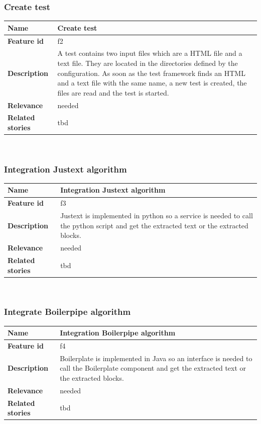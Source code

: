 \subsubsection{Create test}


	\begin{tabular}{ | p{3cm} | p{12cm} |}
	\hline
	\textbf{Name} 				& Create test \\ \hline
	\textbf{Feature id} 		& f2 \\ \hline
	\textbf{Description} 		& A test contains two input files which are a HTML file and a text file. They are located in the directories defined by the configuration. As soon as the test framework finds an HTML and a text file with the same name, a new test is created, the files are read and the test is started.\\ \hline
	\textbf{Relevance} 			& needed \\ \hline
	\textbf{Related stories} 	& tbd \\ \hline
	\end{tabular} \\

\subsubsection{Integration Justext algorithm}


	\begin{tabular}{ | p{3cm} | p{12cm} |}
	\hline
	\textbf{Name} 				& Integration Justext algorithm \\ \hline
	\textbf{Feature id} 		& f3 \\ \hline
	\textbf{Description} 		& Justext is implemented in python so a service is needed to call the python script and get the extracted text or the extracted blocks.\\ \hline
	\textbf{Relevance} 			& needed \\ \hline
	\textbf{Related stories} 	& tbd \\ \hline
	\end{tabular} \\

\subsubsection{Integrate Boilerpipe algorithm}

	\begin{tabular}{ | p{3cm} | p{12cm} |}
	\hline
	\textbf{Name} 				& Integration Boilerpipe algorithm \\ \hline
	\textbf{Feature id} 		& f4 \\ \hline
	\textbf{Description} 		& Boilerplate is implemented in Java so an interface is needed to call the Boilerplate component and get the extracted text or the extracted blocks.\\ \hline
	\textbf{Relevance} 			& needed \\ \hline
	\textbf{Related stories} 	& tbd \\ \hline
	\end{tabular} \\


